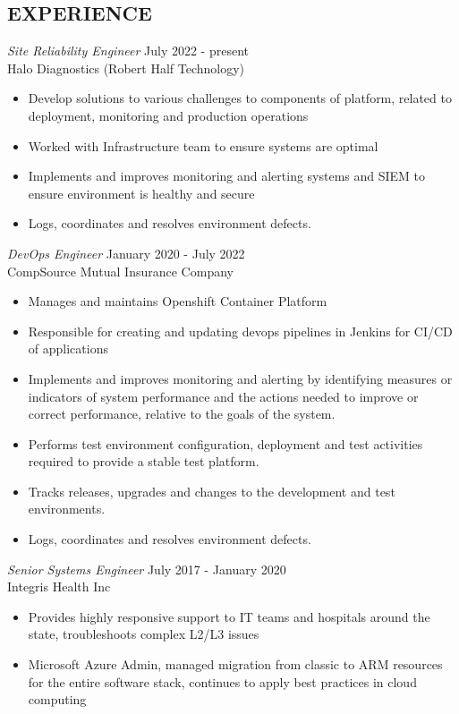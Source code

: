 \documentclass[margin]{res}
\begin{document}
\begin{resume}
\section{EXPERIENCE}
	{\sl Site Reliability Engineer} \hfill July 2022 - present \\
	Halo Diagnostics (Robert Half Technology)
	\begin{itemize} \itemsep -2pt 
		\item Develop solutions to various challenges to components of platform, related to deployment, monitoring and production operations
		\item Worked with Infrastructure team to ensure systems are optimal
		\item Implements and improves monitoring and alerting systems and SIEM to ensure environment is healthy and secure
		\item Logs, coordinates and resolves environment defects.
	\end{itemize}
	{\sl DevOps Engineer} \hfill January 2020 - July 2022 \\
	CompSource Mutual Insurance Company
	\begin{itemize} \itemsep -2pt 
		\item Manages and maintains Openshift Container Platform
		\item Responsible for creating and updating devops pipelines in Jenkins for CI/CD of applications
		\item Implements and improves monitoring and alerting by identifying measures or indicators of system performance and the actions needed to improve or correct performance, relative to the goals of the system.
		\item Performs test environment configuration, deployment and test activities required to provide a stable test platform.
		\item Tracks releases, upgrades and changes to the development and test environments.
		\item Logs, coordinates and resolves environment defects.
	\end{itemize}
	\clearpage
	{\sl Senior Systems Engineer} \hfill July 2017 - January 2020 \\
	Integris Health Inc
	\begin{itemize}  \itemsep -2pt %
		\item Provides highly responsive support to IT teams and hospitals around the state, troubleshoots complex L2/L3 issues
		\item Microsoft Azure Admin, managed migration from classic to ARM resources for the entire software stack, continues to apply best practices in cloud computing

\end{itemize}
\end{resume}
\end{document}
